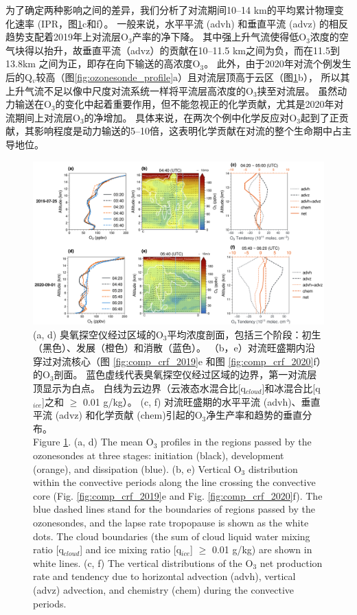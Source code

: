 为了确定两种影响之间的差异，我们分析了对流期间10--14 km的平均累计物理变化速率 (IPR，图\ref{fig:tendency_o3}c和f）。
一般来说，水平平流 (advh) 和垂直平流 (advz) 的相反趋势支配着2019年上对流层O$_3$产率的净下降。
其中强上升气流使得低O$_3$浓度的空气块得以抬升，故垂直平流（advz）的贡献在10--11.5 km之间为负，而在11.5到13.8km 之间为正，即存在向下输送的高浓度O$_3$。
此外，由于2020年对流个例发生后的Q$_v$较高（图\ref{fig:ozonesonde_profile}a）且对流层顶高于云区（图\ref{fig:tendency_o3}b），
所以其上升气流不足以像中尺度对流系统一样将平流层高浓度的O$_3$挟至对流层\citep{Phoenix.2020}。
虽然动力输送在O$_3$的变化中起着重要作用，但不能忽视正的化学贡献，尤其是2020年对流期间上对流层O$_3$的净增加。
具体来说，在两次个例中化学反应对O$_3$起到了正贡献，其影响程度是动力输送的5--10倍，这表明化学贡献在对流的整个生命期中占主导地位。


\begin{figure}[!htbp]
\centering
\includegraphics[width=\textwidth]{./figures/tendency_o3.png}
\caption{
(a, d) 臭氧探空仪经过区域的O$_3$平均浓度剖面，包括三个阶段：初生（黑色）、发展（橙色）和消散（蓝色）。
（b，e）对流旺盛期内沿穿过对流核心（图 \ref{fig:comp_crf_2019}e 和图 \ref{fig:comp_crf_2020}f）的O$_3$剖面。
蓝色虚线代表臭氧探空仪经过区域的边界，第一对流层顶显示为白点。
白线为云边界（云液态水混合比[q$_{cloud}$]和冰混合比[q$_{ice}$]之和 $\geq$ 0.01 g/kg）。
(c, f) 对流旺盛期的水平平流 (advh)、垂直平流 (advz) 和化学贡献 (chem)引起的O$_3$净生产率和趋势的垂直分布。
\\
Figure \ref{fig:tendency_o3}. (a, d) The mean O$_3$ profiles in the regions passed by the ozonesondes
at three stages: initiation (black), development (orange), and dissipation (blue).
(b, e) Vertical O$_3$ distribution within the convective periods along the line crossing the convective core (Fig. \ref{fig:comp_crf_2019}e and Fig. \ref{fig:comp_crf_2020}f).
The blue dashed lines stand for the boundaries of regions passed by the ozonesondes, and the lapse rate tropopause is shown as the white dots.
The cloud boundaries (the sum of cloud liquid water mixing ratio [q$_{cloud}$] and ice mixing ratio [q$_{ice}$] $\geq$ 0.01 g/kg) are shown in white lines.
(c, f) The vertical distributions of the O$_3$ net production rate and tendency due to horizontal advection (advh), vertical (advz) advection, and chemistry (chem) during the convective periods.
}
\label{fig:tendency_o3}
\end{figure}


